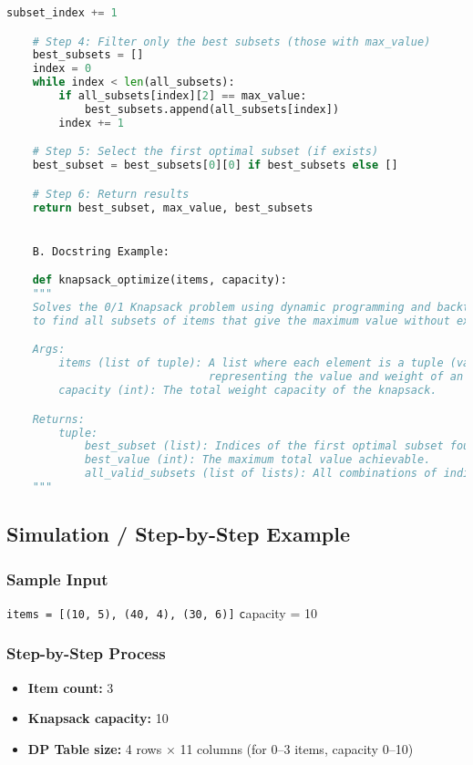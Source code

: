 \documentclass{article}
\begin{document}
\begin{lstlisting}[language=Python]
        subset_index += 1

    # Step 4: Filter only the best subsets (those with max_value)
    best_subsets = []
    index = 0
    while index < len(all_subsets):
        if all_subsets[index][2] == max_value:
            best_subsets.append(all_subsets[index])
        index += 1

    # Step 5: Select the first optimal subset (if exists)
    best_subset = best_subsets[0][0] if best_subsets else []

    # Step 6: Return results
    return best_subset, max_value, best_subsets


    B. Docstring Example:

    def knapsack_optimize(items, capacity):
    """
    Solves the 0/1 Knapsack problem using dynamic programming and backtracking
    to find all subsets of items that give the maximum value without exceeding capacity.

    Args:
        items (list of tuple): A list where each element is a tuple (value, weight)
                               representing the value and weight of an item.
        capacity (int): The total weight capacity of the knapsack.

    Returns:
        tuple:
            best_subset (list): Indices of the first optimal subset found.
            best_value (int): The maximum total value achievable.
            all_valid_subsets (list of lists): All combinations of indices that achieve the best value.
    """
\end{lstlisting}

\subsection*{Simulation / Step-by-Step Example}
\subsubsection*{Sample Input}
    \texttt {items = [(10, 5), (40, 4), (30, 6)]}
    \texttt capacity = 10
\subsubsection*{Step-by-Step Process}
\begin{itemize}
    \item \textbf{Item count:} 3
    \item \textbf{Knapsack capacity:} 10
    \item \textbf{DP Table size:} 4 rows × 11 columns (for 0–3 items, capacity 0–10)
\end{itemize}
\end{document}
